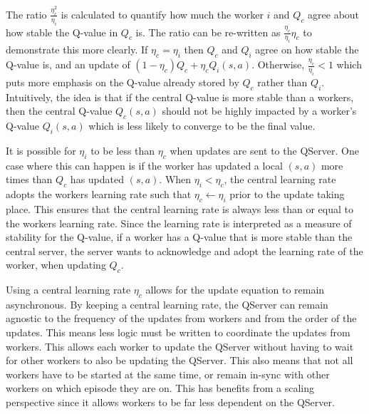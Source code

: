 \documentclass[jair,twoside,11pt,theapa]{article}
\begin{document}
The ratio $\frac{\eta_{c}^{2}}{\eta_{i}}$ is calculated to quantify how much the worker $i$ and $Q_c$ agree about how stable the Q-value in $Q_c$ is. The ratio can be re-written as $\frac{\eta_{c}}{\eta_{i}} \eta_{c}$ to demonstrate this more clearly. If $\eta_{c} = \eta_{i}$ then $Q_c$ and $Q_i$ agree on how stable the Q-value is, and an update of $(1-\eta_{c})Q_c + \eta_{c} Q_i(s,a)$. Otherwise, $\frac{\eta_c}{\eta_i} < 1$ which puts more emphasis on the Q-value already stored by $Q_c$ rather than $Q_i$. Intuitively, the idea is that if the central Q-value is more stable than a workers, then the central Q-value $Q_c(s,a)$ should not be highly impacted by a worker's Q-value $Q_i(s,a)$ which is less likely to converge to be the final value.

It is possible for $\eta_i$ to be less than $\eta_c$ when updates are sent to the QServer. One case where this can happen is if the worker has updated a local $(s,a)$ more times than $Q_c$ has updated $(s,a)$. When $\eta_i < \eta_c$, the central learning rate adopts the workers learning rate such that $\eta_c \leftarrow \eta_i$ prior to the update taking place. This ensures that the central learning rate is always less than or equal to the workers learning rate. Since the learning rate is interpreted as a measure of stability for the Q-value, if a worker has a Q-value that is more stable than the central server, the server wants to acknowledge and adopt the learning rate of the worker, when updating $Q_c$.


Using a central learning rate $\eta_c$ allows for the update equation to remain asynchronous. By keeping a central learning rate, the QServer can remain agnostic to the frequency of the updates from workers and from the order of the updates. This means less logic must be written to coordinate the updates from workers. This allows each worker to update the QServer without having to wait for other workers to also be updating the QServer. This also means that not all workers have to be started at the same time, or remain in-sync with other workers on which episode they are on. This has benefits from a scaling perspective since it allows workers to be far less dependent on the QServer. 
\end{document}
